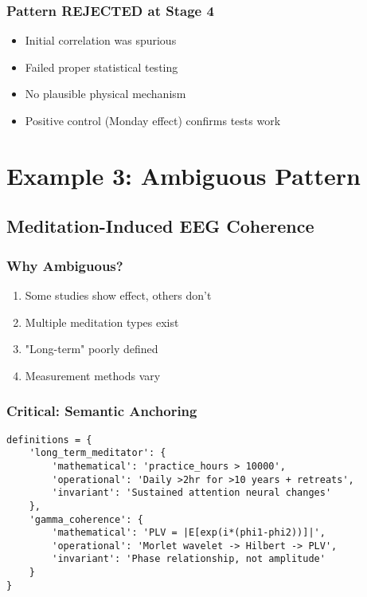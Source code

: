 \documentclass[12pt,oneside]{memoir}
\theoremstyle{plain}
\theoremstyle{definition}
\theoremstyle{remark}
\begin{document}
\subsection{Pattern REJECTED at Stage 4}
\begin{itemize}
\item Initial correlation was spurious
\item Failed proper statistical testing
\item No plausible physical mechanism
\item Positive control (Monday effect) confirms tests work
\end{itemize}

\chapter{Example 3: Ambiguous Pattern}
\section{Meditation-Induced EEG Coherence}

\subsection{Why Ambiguous?}
\begin{enumerate}
\item Some studies show effect, others don't
\item Multiple meditation types exist
\item "Long-term" poorly defined
\item Measurement methods vary
\end{enumerate}

\subsection{Critical: Semantic Anchoring}

\begin{lstlisting}[caption={Ultra-Precise Definitions}]
definitions = {
    'long_term_meditator': {
        'mathematical': 'practice_hours > 10000',
        'operational': 'Daily >2hr for >10 years + retreats',
        'invariant': 'Sustained attention neural changes'
    },
    'gamma_coherence': {
        'mathematical': 'PLV = |E[exp(i*(phi1-phi2))]|',
        'operational': 'Morlet wavelet -> Hilbert -> PLV',
        'invariant': 'Phase relationship, not amplitude'
    }
}
\end{lstlisting}
\end{document}
